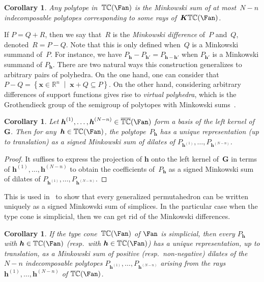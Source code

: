 \documentclass{amsart}
\newtheorem{corollary}[theorem]{Corollary}
\theoremstyle{definition}
\newcommand{\R}{\mathbb{R}} %
\renewcommand{\b}[1]{{\boldsymbol{#1}}} %
\newcommand{\set}[2]{\left\{ #1 \;\middle|\; #2 \right\}} %
\newcommand{\darkblue}{\color{darkblue}} %
\newcommand{\defn}[1]{\textsl{\darkblue #1}} %
\newcommand{\typeCone}{\mathbb{TC}} %
\newcommand{\ctypeCone}{\smash{\overline{\mathbb{TC}}}} %
\begin{document}
\begin{corollary}
Any polytope in~$\ctypeCone(\Fan)$ is the Minkowski sum of at most~$N-n$ indecomposable polytopes corresponding to some rays of~$\b{K}\ctypeCone(\Fan)$.
\end{corollary}

If $P = Q + R$, then we say that~$R$ is the \defn{Minkowski difference} of~$P$ and~$Q$, denoted~${R = P - Q}$. Note that this is only defined when~$Q$ is a Minkowski summand of~$P$.
For instance, we have ${P_\b{h} - P_{\b{h}'} = P_{\b{h} - \b{h'}}}$ when $P_{\b{h}'}$ is a Minkowski summand of $P_\b{h}$.
There are two natural ways this construction generalizes to arbitrary pairs of polyhedra.
On the one hand, one can consider that ${P - Q = \set{\b{x} \in \R^n}{\b{x} + Q \subseteq P}}$.
On the other hand, considering arbitrary differences of support functions gives rise to \defn{virtual polyhedra}, which is the Grothendieck group of the semigroup of polytopes with Minkowski sums~\cite{PukhlikovKhovanskii}.

\begin{corollary}
Let $\b{h}^{(1)},\dots, \b{h}^{(N-n)} \in \ctypeCone(\Fan)$ form a basis of the left kernel of~$\b{G}$. Then for any~$\b{h} \in \ctypeCone(\Fan)$, the polytope~$P_\b{h}$ has a unique representation (up to translation) as a signed Minkowski sum of dilates of $P_{\b{h}^{(1)}}, \dots, P_{\b{h}^{(N-n)}}$.
\end{corollary}

\begin{proof}
It suffises to express the projection of $\b{h}$ onto the left kernel of~$\b{G}$ in terms of $\b{h}^{(1)}, \dots, \b{h}^{(N-n)}$ to obtain the coefficients of~$P_\b{h}$ as a signed Minkowski sum of dilates of $P_{\b{h}^{(1)}}, \dots, P_{\b{h}^{(N-n)}}$.
\end{proof}

This is used in~\cite{ArdilaBenedettiDoker} to show that every generalized permutahedron can be written uniquely as a signed Minkowski sum of simplices. 
In the particular case when the type cone is simplicial, then we can get rid of the Minkowski differences.

\begin{corollary}
If the type cone~$\typeCone(\Fan)$ of $\Fan$ is simplicial, then every $P_\b{h}$ with $\b{h} \in \typeCone(\Fan)$ (resp.~with $\b{h} \in \ctypeCone(\Fan)$) has a unique representation, up to translation, as a Minkowski sum of positive (resp.~non-negative) dilates of the $N-n$ indecomposable polytopes $P_{\b{h}^{(1)}}, \dots, P_{\b{h}^{(N-n)}}$ arising from the rays~$\b{h}^{(1)}, \dots, \b{h}^{(N-n)}$ of $\ctypeCone(\Fan)$.
\end{corollary}
\end{document}
